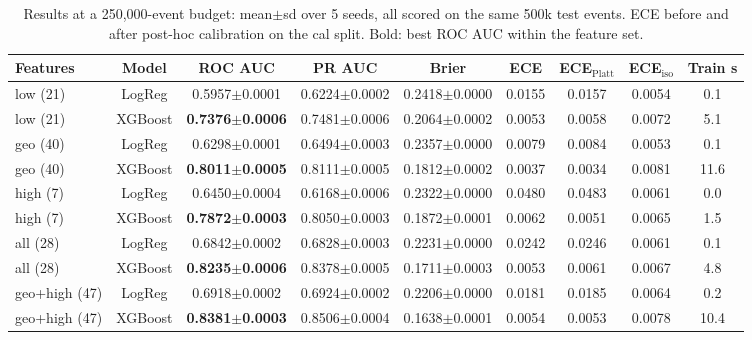 \begin{table}[!t]
\centering
\caption{Results at a 250,000-event budget: mean$\pm$sd over 5 seeds, all scored on the same 500k test events. ECE before and after post-hoc calibration on the cal split. Bold: best ROC AUC within the feature set.}
\label{tab:ml_main}
\footnotesize
\setlength{\tabcolsep}{3.5pt}
\begin{tabular}{lcccccccc}
\toprule
Features & Model & ROC AUC & PR AUC & Brier & ECE & ECE$_\mathrm{Platt}$ & ECE$_\mathrm{iso}$ & Train s \\
\midrule
low (21) & LogReg & 0.5957$\pm$0.0001 & 0.6224$\pm$0.0002 & 0.2418$\pm$0.0000 & 0.0155 & 0.0157 & 0.0054 & 0.1 \\
low (21) & XGBoost & \textbf{0.7376$\pm$0.0006} & 0.7481$\pm$0.0006 & 0.2064$\pm$0.0002 & 0.0053 & 0.0058 & 0.0072 & 5.1 \\
geo (40) & LogReg & 0.6298$\pm$0.0001 & 0.6494$\pm$0.0003 & 0.2357$\pm$0.0000 & 0.0079 & 0.0084 & 0.0053 & 0.1 \\
geo (40) & XGBoost & \textbf{0.8011$\pm$0.0005} & 0.8111$\pm$0.0005 & 0.1812$\pm$0.0002 & 0.0037 & 0.0034 & 0.0081 & 11.6 \\
high (7) & LogReg & 0.6450$\pm$0.0004 & 0.6168$\pm$0.0006 & 0.2322$\pm$0.0000 & 0.0480 & 0.0483 & 0.0061 & 0.0 \\
high (7) & XGBoost & \textbf{0.7872$\pm$0.0003} & 0.8050$\pm$0.0003 & 0.1872$\pm$0.0001 & 0.0062 & 0.0051 & 0.0065 & 1.5 \\
all (28) & LogReg & 0.6842$\pm$0.0002 & 0.6828$\pm$0.0003 & 0.2231$\pm$0.0000 & 0.0242 & 0.0246 & 0.0061 & 0.1 \\
all (28) & XGBoost & \textbf{0.8235$\pm$0.0006} & 0.8378$\pm$0.0005 & 0.1711$\pm$0.0003 & 0.0053 & 0.0061 & 0.0067 & 4.8 \\
geo+high (47) & LogReg & 0.6918$\pm$0.0002 & 0.6924$\pm$0.0002 & 0.2206$\pm$0.0000 & 0.0181 & 0.0185 & 0.0064 & 0.2 \\
geo+high (47) & XGBoost & \textbf{0.8381$\pm$0.0003} & 0.8506$\pm$0.0004 & 0.1638$\pm$0.0001 & 0.0054 & 0.0053 & 0.0078 & 10.4 \\
\bottomrule
\end{tabular}
\end{table}
